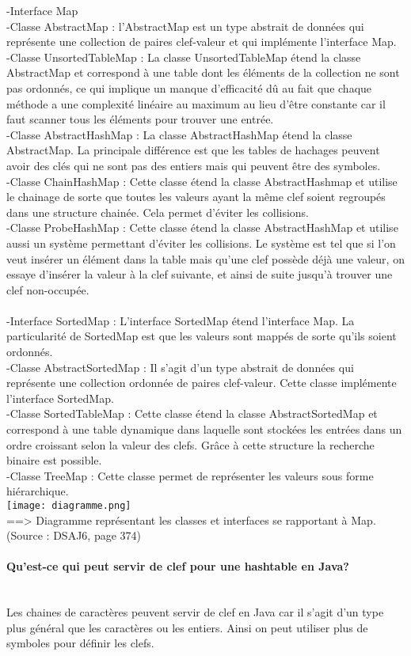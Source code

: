 \documentclass[10pt,a4paper]{article}
\begin{document}
-Interface Map\\
-Classe AbstractMap : l'AbstractMap est un type abstrait de données qui représente une collection de paires clef-valeur et qui implémente l'interface Map.\\
-Classe UnsortedTableMap : La classe UnsortedTableMap étend la classe AbstractMap et correspond à une table dont les éléments de la collection ne sont pas ordonnés, ce qui implique un manque d'efficacité dû au fait que chaque méthode a une complexité linéaire au maximum au lieu d'être constante car il faut scanner tous les éléments pour trouver une entrée. \\
-Classe AbstractHashMap : La classe AbstractHashMap étend la classe AbstractMap. La principale différence est que les tables de hachages peuvent avoir des clés qui ne sont pas des entiers mais qui peuvent être des symboles.  \\ 
-Classe ChainHashMap : Cette classe étend la classe AbstractHashmap et utilise le chainage de sorte que toutes les valeurs ayant la même clef soient regroupés dans une structure chainée. Cela permet d'éviter les collisions.\\
-Classe ProbeHashMap : Cette classe étend la classe AbstractHashMap et utilise aussi un système permettant d'éviter les collisions. Le système est tel que si l'on veut insérer un élément dans la table mais qu'une clef possède déjà une valeur, on essaye d'insérer la valeur à la clef suivante, et ainsi de suite jusqu'à trouver une clef non-occupée. \\ 
\\
-Interface SortedMap : L'interface SortedMap étend l'interface Map. La particularité de SortedMap est que les valeurs sont mappés de sorte qu'ils soient ordonnés.\\
-Classe AbstractSortedMap : Il s'agit d'un type abstrait de données qui représente une collection ordonnée de paires clef-valeur. Cette classe implémente l'interface SortedMap.\\
-Classe SortedTableMap : Cette classe étend la classe AbstractSortedMap et correspond à une table dynamique dans laquelle sont stockées les entrées dans un ordre croissant selon la valeur des clefs. Grâce à cette structure la recherche binaire est possible.  \\
-Classe TreeMap : Cette classe permet de représenter les valeurs sous forme hiérarchique. \\ 

\texttt{[image: diagramme.png]}
\\
==> Diagramme représentant les classes et interfaces se rapportant à Map. \\
(Source : DSAJ6, page 374)\\

\paragraph{Qu'est-ce qui peut servir de clef pour une hashtable en Java?}
\\
Les chaines de caractères peuvent servir de clef en Java car il s'agit d'un type plus général que les caractères ou les entiers. Ainsi on peut utiliser plus de symboles pour définir les clefs. 
\end{document}
